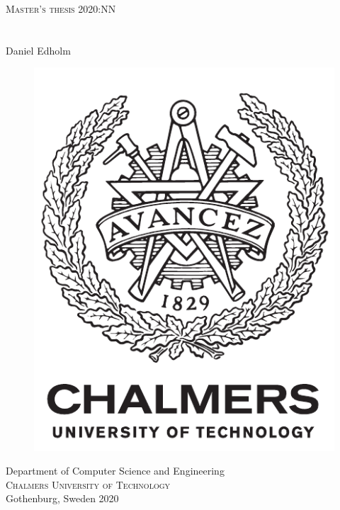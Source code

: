 \newpage
\thispagestyle{empty}
\begin{center}
	\textsc{\large Master's thesis 2020:NN}\\[4cm]
	\textbf{\Large \THETITLE} \\[1cm]
	{\large \TITLEDESCR}\\[1cm]
	{\large Daniel Edholm}
	
	\vfill	
	\begin{figure}[h!]
	\centering
	\includegraphics[width=0.2\pdfpagewidth]{figure/auxiliary/logo_eng.pdf} \\	
	\end{figure}	\vspace{5mm}	
	
	Department of Computer Science and Engineering \\
	\textsc{Chalmers University of Technology} \\
	Gothenburg, Sweden 2020 \\
\end{center}


